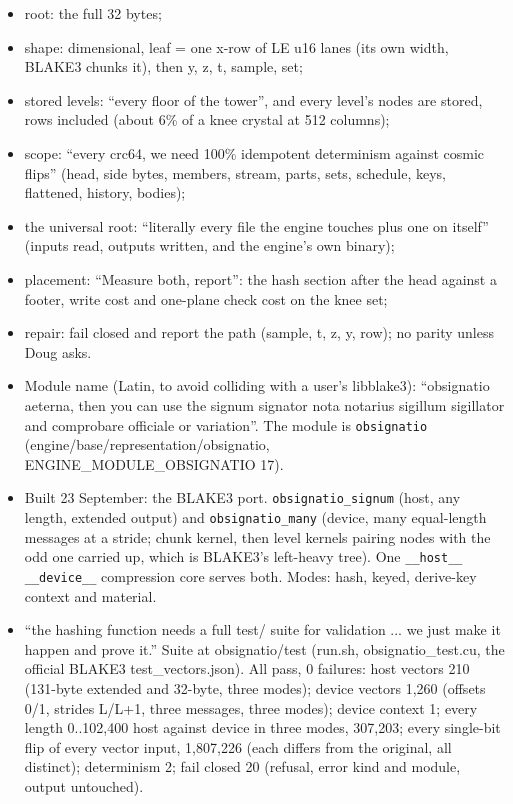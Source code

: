 \begin{itemize}
\item root: the full 32 bytes;
\item shape: dimensional, leaf = one x-row of LE u16 lanes (its own width, BLAKE3 chunks it), then y, z, t, sample, set;
\item stored levels: “every floor of the tower”, and every level's nodes are stored, rows included (about 6\% of a knee crystal at 512 columns);
\item scope: “every crc64, we need 100\% idempotent determinism against cosmic flips” (head, side bytes, members, stream, parts, sets, schedule, keys, flattened, history, bodies);
\item the universal root: “literally every file the engine touches plus one on itself” (inputs read, outputs written, and the engine's own binary);
\item placement: “Measure both, report”: the hash section after the head against a footer, write cost and one-plane check cost on the knee set;
\item repair: fail closed and report the path (sample, t, z, y, row); no parity unless Doug asks.
\item Module name (Latin, to avoid colliding with a user's libblake3): “obsignatio aeterna, then you can use the signum signator nota notarius sigillum sigillator and comprobare officiale or variation”. The module is \texttt{obsignatio} (engine/base/representation/obsignatio, ENGINE\_\allowbreak{}MODULE\_\allowbreak{}OBSIGNATIO 17).
\item Built 23 September: the BLAKE3 port. \texttt{obsignatio\_\allowbreak{}signum} (host, any length, extended output) and \texttt{obsignatio\_\allowbreak{}many} (device, many equal-length messages at a stride; chunk kernel, then level kernels pairing nodes with the odd one carried up, which is BLAKE3's left-heavy tree). One \texttt{\_\allowbreak{}\_\allowbreak{}host\_\allowbreak{}\_\allowbreak{} \_\allowbreak{}\_\allowbreak{}device\_\allowbreak{}\_\allowbreak{}} compression core serves both. Modes: hash, keyed, derive-key context and material.
\item “the hashing function needs a full test/ suite for validation ... we just make it happen and prove it.” Suite at obsignatio/test (run.sh, obsignatio\_\allowbreak{}test.cu, the official BLAKE3 test\_\allowbreak{}vectors.json). All pass, 0 failures: host vectors 210 (131-byte extended and 32-byte, three modes); device vectors 1,260 (offsets 0/1, strides L/L+1, three messages, three modes); device context 1; every length 0..102,400 host against device in three modes, 307,203; every single-bit flip of every vector input, 1,807,226 (each differs from the original, all distinct); determinism 2; fail closed 20 (refusal, error kind and module, output untouched).

\end{itemize}
